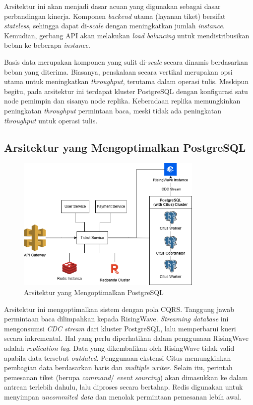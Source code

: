 Arsitektur ini akan menjadi dasar acuan yang digunakan sebagai dasar perbandingan kinerja. Komponen \textit{backend} utama (layanan tiket) bersifat \textit{stateless}, sehingga dapat di-\textit{scale} dengan meningkatkan jumlah \textit{instance}. Kemudian, gerbang API akan melakukan \textit{load balancing} untuk mendistribusikan beban ke beberapa \textit{instance}.

Basis data merupakan komponen yang sulit di-\textit{scale} secara dinamis berdasarkan beban yang diterima. Biasanya, penskalaan secara vertikal merupakan opsi utama untuk meningkatkan \textit{throughput}, terutama dalam operasi tulis. Meskipun begitu, pada arsitektur ini terdapat kluster PostgreSQL dengan konfigurasi satu node pemimpin dan sisanya node replika. Keberadaan replika memungkinkan peningkatan \textit{throughput} permintaan baca, meski tidak ada peningkatan \textit{throughput} untuk operasi tulis.

\subsection{Arsitektur yang Mengoptimalkan PostgreSQL}

\begin{figure}[ht]
    \centering
    \includegraphics[width=0.8\textwidth]{resources/chapter-3/architecture-optimized.png}
    \caption{Arsitektur yang Mengoptimalkan PostgreSQL}
    \label{fig:optimized-architecture}
\end{figure}

Arsitektur ini mengoptimalkan sistem dengan pola CQRS. Tanggung jawab permintaan baca dilimpahkan kepada RisingWave. \textit{Streaming database} ini mengonsumsi \textit{CDC stream} dari kluster PostgreSQL, lalu memperbarui kueri secara inkremental. Hal yang perlu diperhatikan dalam penggunaan RisingWave adalah \textit{replication lag}. Data yang dikembalikan oleh RisingWave tidak valid apabila data tersebut \textit{outdated}. Penggunaan ekstensi Citus memungkinkan pembagian data berdasarkan baris dan \textit{multiple writer}. Selain itu, perintah pemesanan tiket (berupa \textit{command}/ \textit{event sourcing}) akan dimasukkan ke dalam antrean terlebih dahulu, lalu diproses secara bertahap. Redis digunakan untuk menyimpan \textit{uncommited data} dan menolak permintaan pemesanan lebih awal.

